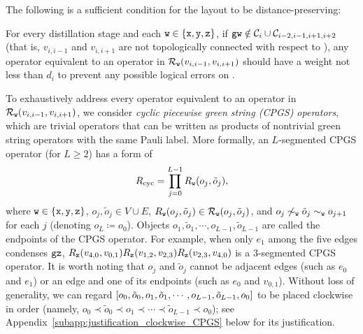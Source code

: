 \documentclass[
 prx,
 reprint,
 superscriptaddress,
 longbibliography,
 dvipsnames
]{revtex4-2}
\begin{document}
The following is a sufficient condition for the layout to be distance-preserving:
\begin{condition}
    For every distillation stage and each $\texttt{w} \in \qty{\texttt{x}, \texttt{y}, \texttt{z}}$, if $\texttt{gw} \notin \mathcal{C}_{i} \cup \mathcal{C}_{i-2,i-1,i+1,i+2}$ (that is, $v_{i,i-1}$ and $v_{i,i+1}$ are not topologically connected with respect to \gw), any operator equivalent to an operator in $\mathcal{R}_{\texttt{w}}\qty(v_{i,i-1}, v_{i,i+1})$ should have a weight not less than $d_i$ to prevent any possible logical errors on .
\end{condition}
To exhaustively address every operator equivalent to an operator in $\mathcal{R}_{\texttt{w}}\qty(v_{i,i-1}, v_{i,i+1})$, we consider \emph{cyclic piecewise green string (CPGS) operators}, which are trivial operators that can be written as products of nontrivial green string operators with the same Pauli label.
More formally, an $L$-segmented CPGS operator (for $L \geq 2$) has a form of
\begin{align}
    R_{\mathrm{cyc}} = \prod_{j=0}^{L-1} R_{\texttt{w}}\qty(o_j, \tilde{o}_j), \label{eq:Rcyc_def}
\end{align}
where $\texttt{w} \in \qty{\texttt{x}, \texttt{y}, \texttt{z}}$, $o_j,\tilde{o}_j \in V \cup E$, $R_{\texttt{w}}\qty(o_j, \tilde{o}_j) \in \mathcal{R}_{\texttt{w}}\qty(o_j, \tilde{o}_j)$, and $o_j \not\sim_{\texttt{w}} \tilde{o}_j \sim_{\texttt{w}} o_{j+1}$ for each $j$ (denoting $o_L \coloneqq o_0$).
Objects $o_1, \tilde{o}_1, \cdots, o_{L-1}, \tilde{o}_{L-1}$ are called the endpoints of the CPGS operator.
For example, when only $e_1$ among the five edges condenses $\texttt{g}\texttt{z}$, $R_{\texttt{z}}\qty(v_{4,0}, v_{0,1}) R_{\texttt{z}}\qty(v_{1,2}, v_{2,3}) R_{\texttt{z}}\qty(v_{2,3}, v_{4,0})$ is a 3-segmented CPGS operator.
It is worth noting that $o_j$ and $\tilde{o}_j$ cannot be adjacent edges (such as $e_0$ and $e_1$) or an edge and one of its endpoints (such as $e_0$ and $v_{0,1}$).
Without loss of generality, we can regard $\qty[o_0, \tilde{o}_0, o_1, \tilde{o}_1, \cdots, o_{L-1}, \tilde{o}_{L-1}, o_0]$ to be placed clockwise in order (namely, $o_0 \prec \tilde{o}_0 \prec o_1 \prec \cdots \prec \tilde{o}_{L-1} \prec o_0$); see Appendix~\ref{subapp:justification_clockwise_CPGS} below for its justification.
\end{document}
